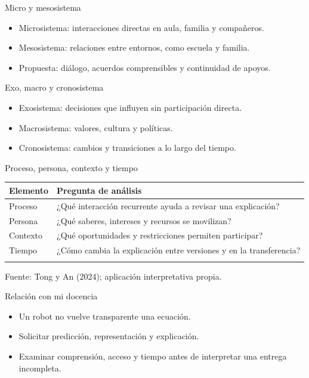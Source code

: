\documentclass[
	spanish,
	aspectratio=1610,
	xcolor={dvipsnames,table}
]{beamer}
\begin{document}
\begin{frame}{Micro y mesosistema}
\fontsize{14}{18}\selectfont\begin{itemize}\setlength{\itemsep}{.45cm}
\item Microsistema: interacciones directas en aula, familia y compañeros.
\item Mesosistema: relaciones entre entornos, como escuela y familia.
\item Propuesta: diálogo, acuerdos comprensibles y continuidad de apoyos.
\end{itemize}
\end{frame}
\begin{frame}{Exo, macro y cronosistema}
\fontsize{14}{18}\selectfont\begin{itemize}\setlength{\itemsep}{.45cm}
\item Exosistema: decisiones que influyen sin participación directa.
\item Macrosistema: valores, cultura y políticas.
\item Cronosistema: cambios y transiciones a lo largo del tiempo.
\end{itemize}
\end{frame}
\begin{frame}{Proceso, persona, contexto y tiempo}
\small\renewcommand{\arraystretch}{1.45}\begin{tabularx}{\linewidth}{X|X}\toprule
\textbf{Elemento} & \textbf{Pregunta de análisis}\\\midrule
Proceso & ¿Qué interacción recurrente ayuda a revisar una explicación?\\\addlinespace
Persona & ¿Qué saberes, intereses y recursos se movilizan?\\\addlinespace
Contexto & ¿Qué oportunidades y restricciones permiten participar?\\\addlinespace
Tiempo & ¿Cómo cambia la explicación entre versiones y en la transferencia?\\\addlinespace
\bottomrule\end{tabularx}\par\vspace{.25cm}\small Fuente: Tong y An (2024); aplicación interpretativa propia.
\end{frame}
\begin{frame}{Relación con mi docencia}
\fontsize{14}{18}\selectfont\begin{itemize}\setlength{\itemsep}{.45cm}
\item Un robot no vuelve transparente una ecuación.
\item Solicitar predicción, representación y explicación.
\item Examinar comprensión, acceso y tiempo antes de interpretar una entrega incompleta.
\end{itemize}
\end{frame}
\end{document}
